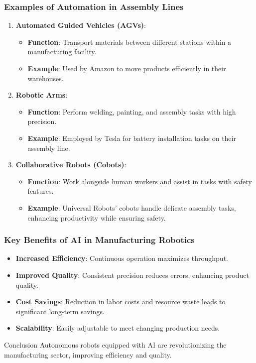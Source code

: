 \documentclass[aspectratio=169]{beamer}
\begin{document}
\begin{frame}[fragile]
    \frametitle{Examples of Automation in Assembly Lines}
    
    \begin{enumerate}
        \item \textbf{Automated Guided Vehicles (AGVs)}:
        \begin{itemize}
            \item \textbf{Function}: Transport materials between different stations within a manufacturing facility.
            \item \textbf{Example}: Used by Amazon to move products efficiently in their warehouses.
        \end{itemize}
        
        \item \textbf{Robotic Arms}:
        \begin{itemize}
            \item \textbf{Function}: Perform welding, painting, and assembly tasks with high precision.
            \item \textbf{Example}: Employed by Tesla for battery installation tasks on their assembly line.
        \end{itemize}
        
        \item \textbf{Collaborative Robots (Cobots)}:
        \begin{itemize}
            \item \textbf{Function}: Work alongside human workers and assist in tasks with safety features.
            \item \textbf{Example}: Universal Robots' cobots handle delicate assembly tasks, enhancing productivity while ensuring safety.
        \end{itemize}
    \end{enumerate}
\end{frame}

\begin{frame}[fragile]
    \frametitle{Key Benefits of AI in Manufacturing Robotics}
    
    \begin{itemize}
        \item \textbf{Increased Efficiency}: Continuous operation maximizes throughput.
        \item \textbf{Improved Quality}: Consistent precision reduces errors, enhancing product quality.
        \item \textbf{Cost Savings}: Reduction in labor costs and resource waste leads to significant long-term savings.
        \item \textbf{Scalability}: Easily adjustable to meet changing production needs.
    \end{itemize}
    
    \begin{block}{Conclusion}
        Autonomous robots equipped with AI are revolutionizing the manufacturing sector, improving efficiency and quality.
    \end{block}
\end{frame}
\end{document}
